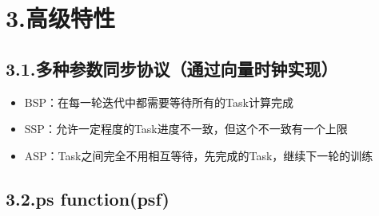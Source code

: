 \documentclass{article}
\begin{document}
\section{3.\hspace*{0.5em}高级特性}\label{section}%

\subsection{3.1.\hspace*{0.5em}多种参数同步协议（通过向量时钟实现）}\label{section}%

\begin{itemize}[noitemsep,topsep=\mdcompacttopsep]%

\item{}
BSP：在每一轮迭代中都需要等待所有的Task计算完成%

\item{}
SSP：允许一定程度的Task进度不一致，但这个不一致有一个上限%

\item{}ASP：Task之间完全不用相互等待，先完成的Task，继续下一轮的训练%
\end{itemize}%

\subsection{3.2.\hspace*{0.5em}ps function(psf)}\label{sec-ps-functionpsf}%
\end{document}

